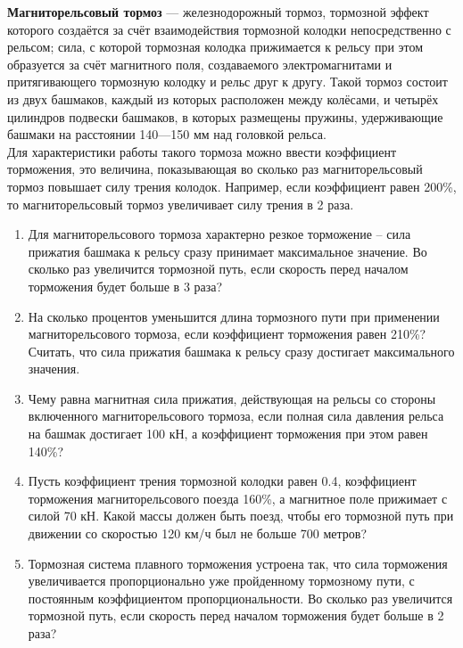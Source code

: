 
\textbf{Магниторельсовый тормоз} — железнодорожный тормоз, тормозной эффект которого создаётся за счёт взаимодействия тормозной колодки непосредственно с рельсом; сила, с которой тормозная колодка прижимается к рельсу при этом образуется за счёт магнитного поля, создаваемого электромагнитами и притягивающего тормозную колодку и рельс друг к другу. Такой тормоз состоит из двух башмаков, каждый из которых расположен между колёсами, и четырёх цилиндров подвески башмаков, в которых размещены пружины, удерживающие башмаки на расстоянии 140—150 мм над головкой рельса.\\
Для характеристики работы такого тормоза можно ввести коэффициент торможения, это величина, показывающая во сколько раз магниторельсовый тормоз повышает силу трения колодок. Например, если коэффициент равен 200\%, то магниторельсовый тормоз увеличивает силу трения в 2 раза.
\begin{enumerate}
\item Для магниторельсового тормоза характерно резкое торможение – сила прижатия башмака к рельсу сразу принимает максимальное значение. Во сколько раз увеличится тормозной путь, если скорость перед началом торможения будет больше в 3 раза?
\item На сколько процентов уменьшится длина тормозного пути при применении магниторельсового тормоза, если коэффициент торможения равен 210\%? Считать, что сила прижатия башмака к рельсу сразу достигает максимального значения.
\item Чему равна магнитная сила прижатия, действующая на рельсы со стороны включенного магниторельсового тормоза, если полная сила давления рельса на башмак достигает 100 кН, а коэффициент торможения при этом равен 140\%?
\item Пусть коэффициент трения тормозной колодки равен 0.4, коэффициент торможения магниторельсового поезда 160\%, а магнитное поле прижимает с силой 70 кН. Какой массы должен быть поезд, чтобы его тормозной путь при движении со скоростью 120 км/ч был не больше 700 метров?
\item Тормозная система плавного торможения устроена так, что сила торможения увеличивается пропорционально уже пройденному тормозному пути, с постоянным коэффициентом пропорциональности. Во сколько раз увеличится тормозной путь, если скорость перед началом торможения будет больше в 2 раза?
\end{enumerate}